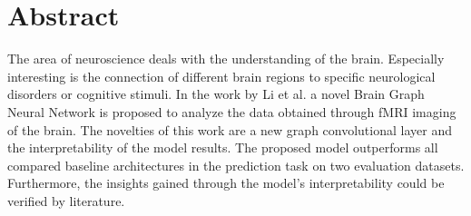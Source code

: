 \section*{Abstract}

The area of neuroscience deals with the understanding of the brain. Especially interesting is the connection of different brain regions to specific neurological disorders or cognitive stimuli. 
In the work by Li et al. \cite{LI2021102233} a novel Brain Graph Neural Network is proposed to analyze the data obtained through fMRI imaging of the brain. The novelties of this work are a new graph convolutional layer and the interpretability of the model results. 
The proposed model outperforms all compared baseline architectures in the prediction task on two evaluation datasets. Furthermore, the insights gained through the model's interpretability could be verified by literature.